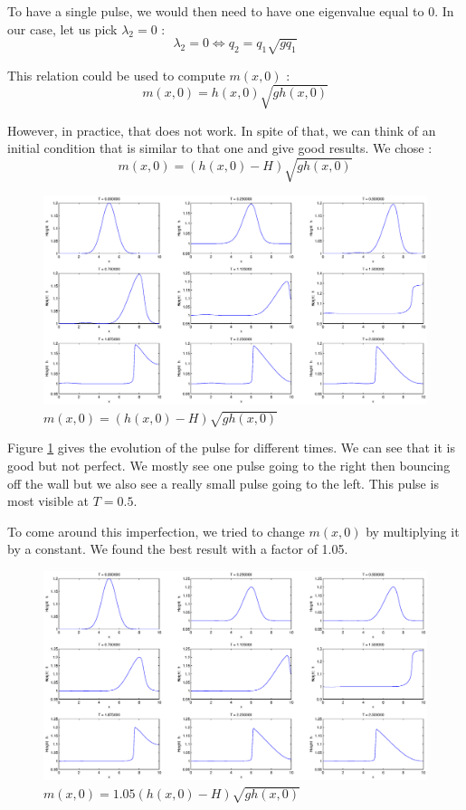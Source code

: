 To have a single pulse, we would then need to have one eigenvalue equal to 0. In our case, let us pick $\lambda_2 =0$ : 
$$\lambda_2 = 0 \iff q_2 = q_1\sqrt{gq_1}$$

This relation could be used to compute $m(x,0)$ : 
$$m(x,0) = h(x,0)\sqrt{gh(x,0)}$$

However, in practice, that does not work. In spite of that, we can think of an initial condition that is similar to that one and give good results. We chose :
$$m(x,0) = (h(x,0) - H)\sqrt{gh(x,0)}$$

\begin{figure}
\begin{center}
\includegraphics[scale=0.35]{firstTry.eps}
\caption{$m(x,0) =(h(x,0) - H)\sqrt{gh(x,0)}$ }
\label{firstTry}
\end{center}
\end{figure}

Figure \ref{firstTry} gives the evolution of the pulse for different times. We can see that it is good but not perfect. We mostly see one pulse going to the right then bouncing off the wall but we also see a really small pulse going to the left. This pulse is most visible at $T=0.5$.

To come around this imperfection, we tried to change $m(x,0)$ by multiplying it by a constant. We found the best result with a factor of 1.05.

\begin{figure}
\begin{center}
\includegraphics[scale=0.35]{secondTry.eps}
\caption{$m(x,0) =1.05(h(x,0) - H)\sqrt{gh(x,0)}$ }
\label{secondTry}
\end{center}
\end{figure}

